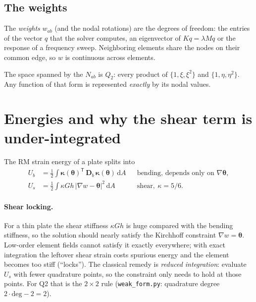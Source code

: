 \subsection{The weights}
The \emph{weights} $w_{ab}$ (and the nodal rotations) are the degrees of freedom:
the entries of the vector $q$ that the solver computes, an eigenvector of
$K q = \lambda M q$ or the response of a frequency sweep. Neighboring elements share
the nodes on their common edge, so $w$ is continuous across elements.

The space spanned by the $N_{ab}$ is $Q_2$: every product of $\{1, \xi, \xi^2\}$ and
$\{1, \eta, \eta^2\}$. Any function of that form is represented \emph{exactly} by its
nodal values.

\section{Energies and why the shear term is under-integrated}

The RM strain energy of a plate splits into
\begin{align}
  U_b &= \tfrac12 \int \boldsymbol{\kappa}(\boldsymbol{\theta})^\mathsf{T}\, \mathbf{D}_b\,
         \boldsymbol{\kappa}(\boldsymbol{\theta}) \,\mathrm{d}A
         && \text{bending, depends only on } \nabla\boldsymbol{\theta}, \\
  U_s &= \tfrac12 \int \kappa G h\, |\nabla w - \boldsymbol{\theta}|^2 \,\mathrm{d}A
         && \text{shear}, \ \kappa = 5/6 .
\end{align}
\paragraph{Shear locking.} For a thin plate the shear stiffness $\kappa G h$ is huge
compared with the bending stiffness, so the solution should nearly satisfy the
Kirchhoff constraint $\nabla w = \boldsymbol{\theta}$. Low-order element fields
cannot satisfy it exactly everywhere; with exact integration the leftover shear
strain costs spurious energy and the element becomes too stiff (``locks''). The
classical remedy is \emph{reduced integration}: evaluate $U_s$ with fewer quadrature
points, so the constraint only needs to hold at those points. For Q2 that is the
$2\times 2$ rule (\texttt{weak\_form.py}: quadrature degree $2\cdot\mathrm{deg} - 2 = 2$).

